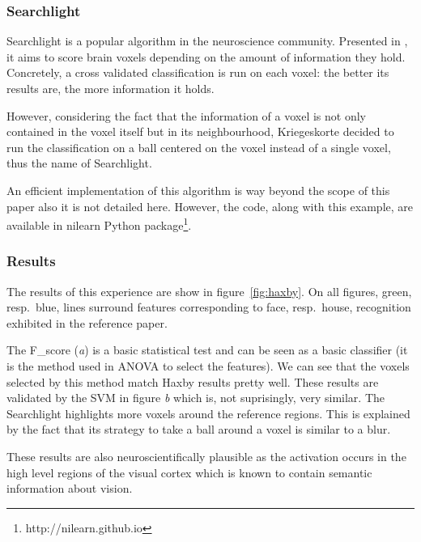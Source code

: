 \documentclass{frontiersSCNS} %
\newcounter{x}
\newcounter{y}
\begin{document}

\subsubsection{Searchlight}
\label{searchlight}

Searchlight is a popular algorithm in the neuroscience community.
Presented in \cite{kriegeskorte2006}, it aims to score
brain voxels depending on the amount of information they hold. Concretely, a
cross validated classification is run on each voxel: the better its results are,
the more information it holds.

However, considering the fact that the information of a voxel is not only
contained in the voxel itself but in its neighbourhood, Kriegeskorte decided to run
the classification on a ball centered on the voxel instead of a single voxel,
thus the name of Searchlight.

An efficient implementation of this algorithm is way beyond the scope of this
paper also it is not detailed here. However, the code, along with this example,
are available in nilearn Python package\footnote{http://nilearn.github.io}.

\subsubsection{Results}

The results of this experience are show in figure~\ref{fig:haxby}.
On all figures, green, resp.\ blue,
lines surround features corresponding to face, resp.\ house, recognition
exhibited in the reference paper.

The F\_score (\textit{a}) is a basic statistical test and can be seen as a basic
classifier (it is the method used in ANOVA to select the features).
We can see that the voxels selected by this method match
Haxby results pretty well. These results are validated by the SVM in figure
\textit{b} which is, not suprisingly, very similar.
The Searchlight highlights more voxels around the reference regions. This is
explained by the fact that its strategy to take a ball around a voxel
is similar to a blur.

These results are also neuroscientifically plausible as the activation occurs in the
high level regions of the visual cortex which is known to contain semantic
information about vision.
\end{document}
